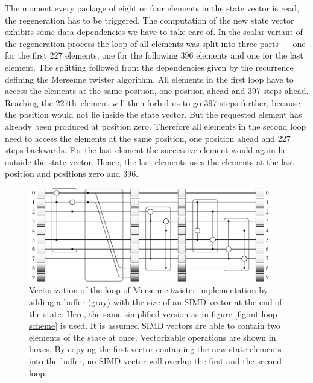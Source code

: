 \documentclass{stdlocal}
\begin{document}
    The moment every package of eight or four elements in the state vector is read, the regeneration has to be triggered.
    The computation of the new state vector exhibits some data dependencies we have to take care of.
    In the scalar variant of the regeneration process the loop of all elements was split into three parts --- one for the first 227 elements, one for the following 396 elements and one for the last element.
    The splitting followed from the dependencies given by the recurrence defining the Mersenne twister algorithm.
    All elements in the first loop have to access the elements at the same position, one position ahead and 397 steps ahead.
    Reaching the 227th~element will then forbid us to go 397 steps further, because the position would not lie inside the state vector.
    But the requested element has already been produced at position zero.
    Therefore all elements in the second loop need to access the elements at the same position, one position ahead and 227 steps backwards.
    For the last element the successive element would again lie outside the state vector.
    Hence, the last elements uses the elements at the last position and positions zero and 396.

    \begin{figure}
      \center
      \includegraphics[width=0.95\textwidth]{figures/mt19937_vector_loop_scheme.pdf}
      \caption[Mersenne Twister Vector Loop Scheme]{
        Vectorization of the loop of Mersenne twister implementation by adding a buffer (gray) with the size of an SIMD vector at the end of the state.
        Here, the same simplified version as in figure \ref{fig:mt-loop-scheme} is used.
        It is assumed SIMD vectors are able to contain two elements of the state at once.
        Vectorizable operations are shown in boxes.
        By copying the first vector containing the new state elements into the buffer, no SIMD vector will overlap the first and the second loop.
      }
      \label{fig:mt-vector-loop-scheme}
    \end{figure}
\end{document}
